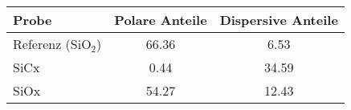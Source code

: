 \begin{tabular}{lcc}
    \toprule
    Probe & Polare Anteile & Dispersive Anteile \\
    \midrule
    Referenz (SiO$_2$) & 66.36 & 6.53 \\
    SiCx & 0.44 & 34.59 \\
    SiOx & 54.27 & 12.43 \\
    \bottomrule
\end{tabular}
